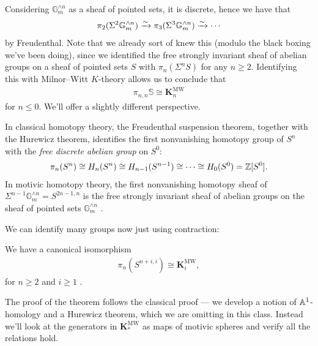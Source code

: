 \documentclass[11pt,openany]{book}
\let\smashprod\wedge
\providecommand{\KMW}{\mathbf{K}^\mathrm{MW}}
\begin{document}
Considering $\mathbb{G}_m^{\smashprod n}$ as a sheaf of pointed sets, it is discrete, hence we have that
\begin{align*}
    \pi_2(\Sigma^2 \mathbb{G}_m^{\smashprod n}) \xto{\sim} \pi_3(\Sigma^3 \mathbb{G}_m^{\smashprod n}) \xto{\sim} \cdots 
\end{align*}
by Freudenthal. Note that we already sort of knew this (modulo the black boxing we've been doing), since we identified the free strongly invariant sheaf of abelian groups on a sheaf of pointed sets $S$ with $\pi_n(\Sigma^n S)$ for any $n \ge 2$. Identifying this with Milnor--Witt $K$-theory allows us to conclude that
\begin{align*}
    \pi_{n,n}\mathbb{S}\cong \KMW_n
\end{align*}
for $n\le 0$. We'll offer a slightly different perspective.

\begin{intuition} In classical homotopy theory, the Freudenthal suspension theorem, together with the Hurewicz theorem, identifies the first nonvanishing homotopy group of $S^n$ with the \textit{free discrete abelian group} on $S^0$:
\begin{align*}
    \pi_n(S^n) \cong H_n(S^n) \cong H_{n-1}(S^{n-1}) \cong \cdots \cong H_0(S^0) = \mathbb{Z}[S^0].
\end{align*}
In motivic homotopy theory, the first nonvanishing homotopy sheaf of $\Sigma^{n-1} \mathbb{G}_m^{\smashprod n} = S^{2n-1,n}$ is the free strongly invariant sheaf of abelian groups on the sheaf of pointed sets $\mathbb{G}_m^{\smashprod n}$ \cite[1.23]{Morel}.
\end{intuition}

We can identify many groups now just using contraction:

\begin{corollary} We have a canonical isomorphism
\begin{align*}
    \pi_n \left( S^{n+i,i} \right) \cong \KMW_i,
\end{align*}
for $n\ge 2$ and $i\ge 1$ \cite[p.~167]{Morel}.
\end{corollary}

The proof of the theorem follows the classical proof --- we develop a notion of $\mathbb{A}^1$-homology and a Hurewicz theorem, which we are omitting in this class. Instead we'll look at the generators in $\KMW_\ast$ as maps of motivic spheres and verify all the relations hold.
\end{document}
